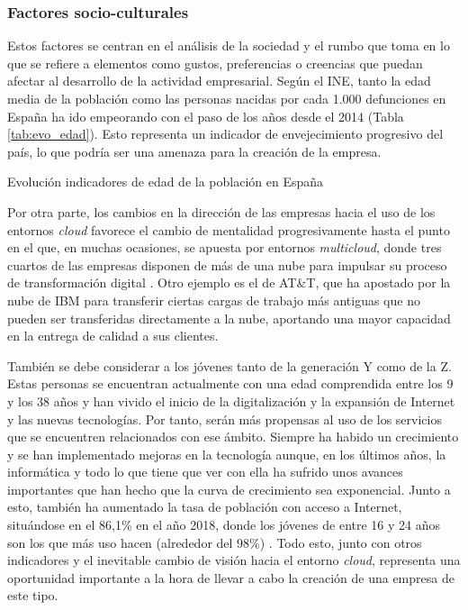 \clearpage


\subsubsection{Factores socio-culturales}
Estos factores se centran en el análisis de la sociedad y el rumbo que toma en lo que se refiere a elementos como gustos, preferencias o creencias que puedan afectar al desarrollo de la actividad empresarial. Según el \acf{INE}, tanto la edad media de la población como las personas nacidas por cada 1.000 defunciones en España ha ido empeorando con el paso de los años desde el 2014 (Tabla \ref{tab:evo_edad}). Esto representa un indicador de envejecimiento progresivo del país, lo que podría ser una amenaza para la creación de la empresa.

\begin{table}[!htbp]
	\centering
	{\small
		
	}
	\caption[Evolución indicadores de edad de la población en España]
	{Evolución indicadores de edad de la población en España}
	\label{tab:evo_edad}
\end{table}

Por otra parte, los cambios en la dirección de las empresas hacia el uso de los entornos \textit{cloud} favorece el cambio de mentalidad progresivamente hasta el punto en el que, en muchas ocasiones, se apuesta por entornos \textit{multicloud}, donde tres cuartos de las empresas disponen de más de una nube para impulsar su proceso de transformación digital \cite{itusermulticloud2019}. Otro ejemplo es el de AT\&T, que ha apostado por la nube de IBM  para transferir ciertas cargas de trabajo más antiguas que no pueden ser transferidas directamente a la nube, aportando una mayor capacidad en la entrega de calidad a sus clientes. 

También se debe considerar a los jóvenes tanto de la generación Y como de la Z. Estas personas se encuentran actualmente con una edad comprendida entre los 9 y los 38 años y han vivido el inicio de la digitalización y la expansión de Internet y las nuevas tecnologías. Por tanto, serán más propensas al uso de los servicios que se encuentren relacionados con ese ámbito. Siempre ha habido un crecimiento y se han implementado mejoras en la tecnología aunque, en los últimos años, la informática y todo lo que tiene que ver con ella ha sufrido unos avances importantes que han hecho que la curva de crecimiento sea exponencial. Junto a esto, también ha aumentado la tasa de población con acceso a Internet, situándose en el 86,1\% en el año 2018, donde los jóvenes de entre 16 y 24 años son los que más uso hacen (alrededor del 98\%) \cite{ineinternet}. Todo esto, junto con otros indicadores y el inevitable cambio de visión hacia el entorno \textit{cloud}, representa una oportunidad importante a la hora de llevar a cabo la creación de una empresa de este tipo.

